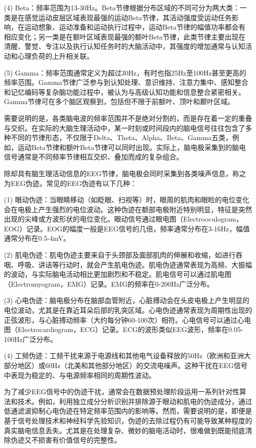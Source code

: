 (4) Beta：频率范围为13-30Hz。Beta节律根据分布区域的不同可分为两大类：一类是在感觉运动皮层区域表现最强的运动Beta节律，其活动强度受运动任务影响，在运动想象、运动准备和运动执行过程中，运动Beta节律的幅值功率都会有相应变化；另一类是在额叶区域表现最强的额叶Beta节律，此类节律主要出现在清醒、警觉、专注以及执行认知任务时的大脑活动中，其强度的增加通常与认知活动和心理负荷的上升相关联。

(5) Gamma：频率范围通常定义为超过30Hz，有时也指25Hz至100Hz甚至更高的频率范围。Gamma节律广泛参与到认知处理、意识维持、注意力集中、感知整合和记忆编码等复杂脑功能过程中，被认为与高级认知功能和信息整合紧密相关。Gamma节律可在多个脑区观察到，包括但不限于前额叶、顶叶和颞叶区域。

需要说明的是，各类脑电波的频率范围并不是绝对分割的，而是存在着一定的重叠与交织。在实际的大脑生理活动中，某一时刻或时间段内的脑电信号往往包含了多种不同的节律形态，不仅限于Delta、Theta、Alpha、Beta、Gamma五类，例如，运动Beta节律和额叶Beta节律可以同时出现。实际上，脑电极采集到的脑电信号通常是不同频率节律相互交织、叠加而成的复杂组合。

除却具有脑生理活动信息的EEG节律，脑电极会同时采集到各类噪声信息，称之为EEG伪迹。常见的EEG伪迹有以下几种：

(1) 眼动伪迹：当眼睛移动（如眨眼、扫视等）时，眼周的肌肉和眼睑的电位变化会在电极上产生强烈的电位波动。这种伪迹在额部电极附近特别明显，特征是突然出现的尖峰或方波形状的电位变化。眼动信号通过眼电图（Electrooculogram，EOG）记录。EOG的幅度一般是EEG信号的几倍，频率通常分布在3-16Hz，幅值通常分布在0.5-4mV。

(2) 肌电伪迹：肌电伪迹主要来自于头颈部及面部肌肉的伸展和收缩，如进行吞咽、呼吸、讲话等行动时，就会产生肌电伪迹。肌电伪迹通常表现为高频、大振幅的波动，与实际脑电活动相比更加剧烈和不稳定。肌电信号可以通过肌电图（Electromyogram，EMG）记录。EMG的频率在0-200Hz广泛分布。

(3) 心电伪迹：脑电极分布在脑部血管附近，心脏搏动会在头皮电极上产生明显的电位波动，尤其是在靠近耳朵后部的乳突区域。心电伪迹通常表现为周期性出现的正弦波形，与心脏搏动频率（大约每分钟60-100次）相符。心电信号可以通过心电图（Electrocardiogram，ECG）记录。ECG的波形类似EEG波形，频率在0.05-100Hz广泛分布。

(4) 工频伪迹：工频干扰来源于电源线和其他电气设备释放的50Hz（欧洲和亚洲大部分地区）或60Hz（北美和其他部分地区）的交流电噪声。这种干扰在EEG信号中表现为稳定的、与电源频率相同的周期性波动。

为了减少EEG信号中的伪迹干扰，通常会在数据预处理阶段运用一系列针对性算法和技术。例如，利用独立成分分析识别并排除源于眼动和肌电的伪迹成分，通过低通滤波抑制心电伪迹在特定频率范围内的影响等。然而，需要说明的是，即便是基于信号处理技术和神经科学先验知识，伪迹的去除过程仍有可能导致某种程度的真实脑电信息丢失。尤其是在处理复杂、微妙的脑电活动时，很难做到既能彻底清除伪迹又不损害有价值信号的完整性。

